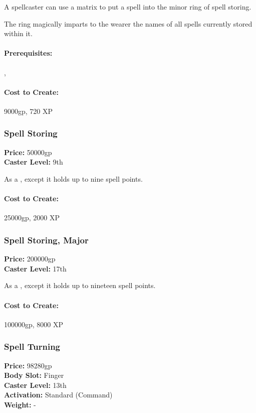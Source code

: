 A spellcaster can use a matrix to put a spell into the minor ring of spell storing.

The ring magically imparts to the wearer the names of all spells currently stored within it.


\paragraph{Prerequisites:} , 

\paragraph{Cost to Create:} 9000gp, 720 XP
\subsubsection{Spell Storing}
\label{Item:SpellStoring}
   \textbf{Price:} 50000gp
\\ \textbf{Caster Level:} 9th

As a , except it holds up to nine spell points.

\paragraph{Cost to Create:} 25000gp, 2000 XP
\subsubsection{Spell Storing, Major}
\label{Item:SpellStoringMajor}
   \textbf{Price:} 200000gp
\\ \textbf{Caster Level:} 17th

As a , except it holds up to nineteen spell points.

\paragraph{Cost to Create:} 100000gp, 8000 XP
\subsubsection{Spell Turning}
\label{Item:SpellTurning}
   \textbf{Price:} 98280gp
\\ \textbf{Body Slot:} Finger
\\ \textbf{Caster Level:} 13th
\\ \textbf{Activation:} Standard (Command)
\\ \textbf{Weight:} -

